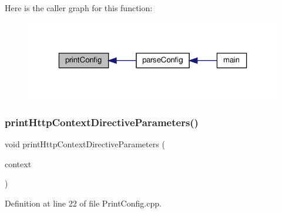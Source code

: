 Here is the caller graph for this function\+:
\nopagebreak
\begin{figure}[H]
\begin{center}
\leavevmode
\includegraphics[width=323pt]{classft_1_1_print_config_a09fbf488251ed5f5079e798b1ce04caf_icgraph}
\end{center}
\end{figure}
\mbox{\label{classft_1_1_print_config_af912dc88061594effceb350034b7c5d9}} 
\subsubsection{\texorpdfstring{print\+Http\+Context\+Directive\+Parameters()}{printHttpContextDirectiveParameters()}}
{\footnotesize\ttfamily void print\+Http\+Context\+Directive\+Parameters (\begin{DoxyParamCaption}\item[{\hyperlink{classft_1_1_http_block}{ft\+::\+Http\+Block} \&}]{context }\end{DoxyParamCaption})\hspace{0.3cm}{\ttfamily [static]}}



Definition at line 22 of file Print\+Config.\+cpp.



